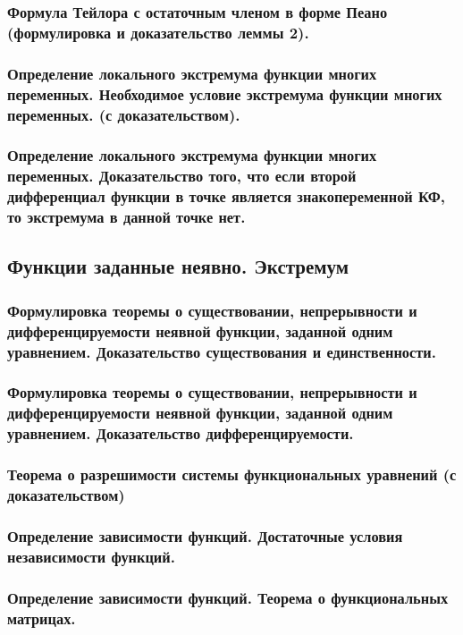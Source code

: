 \documentclass[10pt]{article}
\begin{document}
    \subsubsection{Формула Тейлора с остаточным членом в форме Пеано (формулировка и доказательство леммы 2).}
    \subsubsection{Определение локального экстремума функции многих переменных. Необходимое условие экстремума функции многих переменных. (с доказательством).}
    \subsubsection{Определение локального экстремума функции многих переменных. Доказательство того, что если второй дифференциал функции в точке является знакопеременной КФ, то экстремума в данной точке нет.}
    \subsection{Функции заданные неявно. Экстремум}
    \subsubsection{Формулировка теоремы о существовании, непрерывности и дифференцируемости неявной функции, заданной одним уравнением. Доказательство существования и единственности.}
    \subsubsection{Формулировка теоремы о существовании, непрерывности и дифференцируемости неявной функции, заданной одним уравнением. Доказательство дифференцируемости.}
    \subsubsection{Теорема о разрешимости системы функциональных уравнений (с доказательством)}
    \subsubsection{Определение зависимости функций. Достаточные условия независимости функций.}
    \subsubsection{Определение зависимости функций. Теорема о функциональных матрицах.}
\end{document}
